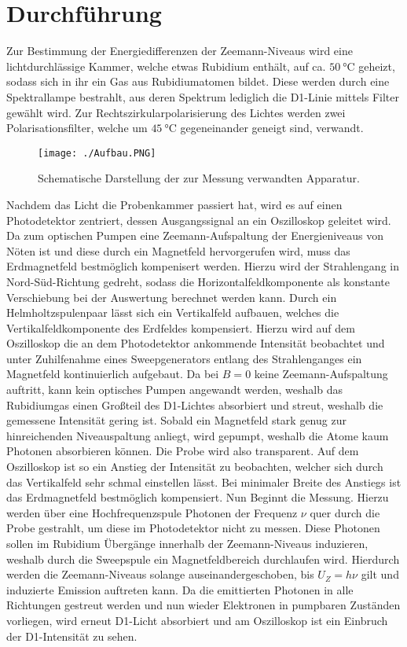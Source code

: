 \section{Durchführung}
\label{sec:Durchführung}
Zur Bestimmung der Energiedifferenzen der Zeemann-Niveaus wird eine lichtdurchlässige Kammer, welche etwas Rubidium enthält, auf ca. $\SI{50}{\celsius}$ geheizt, sodass sich in ihr ein Gas aus Rubidiumatomen bildet. Diese werden durch eine Spektrallampe bestrahlt, aus deren Spektrum lediglich die D1-Linie mittels Filter gewählt wird. Zur Rechtszirkularpolarisierung des Lichtes werden zwei Polarisationsfilter, welche um $\SI{45}{\celsius}$ gegeneinander geneigt sind, verwandt.
\begin{figure}
  \centering
  \texttt{[image: ./Aufbau.PNG]}
  \caption{Schematische Darstellung der zur Messung verwandten Apparatur\cite{Anleitung}.}
  \label{fig:Aufbau}
\end{figure}
Nachdem das Licht die Probenkammer passiert hat, wird es auf einen Photodetektor zentriert, dessen Ausgangssignal an ein Oszilloskop geleitet wird.
Da zum optischen Pumpen eine Zeemann-Aufspaltung der Energieniveaus von Nöten ist und diese durch ein Magnetfeld hervorgerufen wird, muss das Erdmagnetfeld bestmöglich kompenisert werden. Hierzu wird der Strahlengang in Nord-Süd-Richtung gedreht, sodass die Horizontalfeldkomponente als konstante Verschiebung bei der Auswertung berechnet werden kann. Durch ein Helmholtzspulenpaar lässt sich ein Vertikalfeld aufbauen, welches die Vertikalfeldkomponente des Erdfeldes kompensiert. Hierzu wird auf dem Oszilloskop die an dem Photodetektor ankommende Intensität beobachtet und unter Zuhilfenahme eines Sweepgenerators entlang des Strahlenganges ein Magnetfeld kontinuierlich aufgebaut. Da bei $B=0$ keine Zeemann-Aufspaltung auftritt, kann kein optisches Pumpen angewandt werden, weshalb das Rubidiumgas einen Großteil des D1-Lichtes absorbiert und streut, weshalb die gemessene Intensität gering ist. Sobald ein Magnetfeld stark genug zur hinreichenden Niveauspaltung anliegt, wird gepumpt, weshalb die Atome kaum Photonen absorbieren können. Die Probe wird also transparent. Auf dem Oszilloskop ist so ein Anstieg der Intensität zu beobachten, welcher sich durch das Vertikalfeld sehr schmal einstellen lässt. Bei minimaler Breite des Anstiegs ist das Erdmagnetfeld bestmöglich kompensiert.
Nun Beginnt die Messung. Hierzu werden über eine Hochfrequenzspule Photonen der Frequenz $\nu$ quer durch die Probe gestrahlt, um diese im Photodetektor nicht zu messen. Diese Photonen sollen im Rubidium Übergänge innerhalb der Zeemann-Niveaus induzieren, weshalb durch die Sweepspule ein Magnetfeldbereich durchlaufen wird. Hierdurch werden die Zeemann-Niveaus solange auseinandergeschoben, bis $U_Z=h\nu$ gilt und induzierte Emission auftreten kann. Da die emittierten Photonen in alle Richtungen gestreut werden und nun wieder Elektronen in pumpbaren Zuständen vorliegen, wird erneut D1-Licht absorbiert und am Oszilloskop ist ein Einbruch der D1-Intensität zu sehen.
